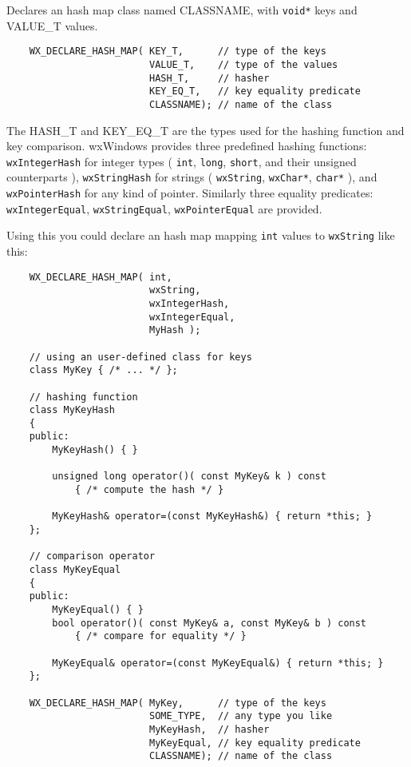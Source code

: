 Declares an hash map class named CLASSNAME, with {\tt void*} keys
and VALUE\_T values.

\begin{verbatim}
    WX_DECLARE_HASH_MAP( KEY_T,      // type of the keys
                         VALUE_T,    // type of the values
                         HASH_T,     // hasher
                         KEY_EQ_T,   // key equality predicate
                         CLASSNAME); // name of the class
\end{verbatim}

The HASH\_T and KEY\_EQ\_T are the types
used for the hashing function and key comparison. wxWindows provides
three predefined hashing functions: {\tt wxIntegerHash}
for integer types ( {\tt int}, {\tt long}, {\tt short},
and their unsigned counterparts ), {\tt wxStringHash} for strings
( {\tt wxString}, {\tt wxChar*}, {\tt char*} ), and
{\tt wxPointerHash} for any kind of pointer.
Similarly three equality predicates:
{\tt wxIntegerEqual}, {\tt wxStringEqual}, {\tt wxPointerEqual} are provided.

Using this you could declare an hash map mapping {\tt int} values
to {\tt wxString} like this:

\begin{verbatim}
    WX_DECLARE_HASH_MAP( int,
                         wxString,
                         wxIntegerHash,
                         wxIntegerEqual,
                         MyHash );

    // using an user-defined class for keys
    class MyKey { /* ... */ };

    // hashing function
    class MyKeyHash
    {
    public:
        MyKeyHash() { }

        unsigned long operator()( const MyKey& k ) const
            { /* compute the hash */ }

        MyKeyHash& operator=(const MyKeyHash&) { return *this; }
    };

    // comparison operator
    class MyKeyEqual
    {
    public:
        MyKeyEqual() { }
        bool operator()( const MyKey& a, const MyKey& b ) const
            { /* compare for equality */ }

        MyKeyEqual& operator=(const MyKeyEqual&) { return *this; }
    };

    WX_DECLARE_HASH_MAP( MyKey,      // type of the keys
                         SOME_TYPE,  // any type you like
                         MyKeyHash,  // hasher
                         MyKeyEqual, // key equality predicate
                         CLASSNAME); // name of the class
\end{verbatim}

